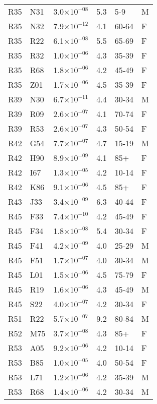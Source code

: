 \begin{longtable}{lllrll}
   R35 & N31 & 3.0$\times10^{-08}$ & 5.3 & 5-9 & M \\ 
   R35 & N32 & 7.9$\times10^{-12}$ & 4.1 & 60-64 & F \\ 
   R35 & R22 & 6.1$\times10^{-08}$ & 5.5 & 65-69 & F \\ 
   R35 & R32 & 1.0$\times10^{-06}$ & 4.3 & 35-39 & F \\ 
   R35 & R68 & 1.8$\times10^{-06}$ & 4.2 & 45-49 & F \\ 
   R35 & Z01 & 1.7$\times10^{-06}$ & 4.5 & 35-39 & F \\ 
   R39 & N30 & 6.7$\times10^{-11}$ & 4.4 & 30-34 & M \\ 
   R39 & R09 & 2.6$\times10^{-07}$ & 4.1 & 70-74 & F \\ 
   R39 & R53 & 2.6$\times10^{-07}$ & 4.3 & 50-54 & F \\ 
   R42 & G54 & 7.7$\times10^{-07}$ & 4.7 & 15-19 & M \\ 
   R42 & H90 & 8.9$\times10^{-09}$ & 4.1 & 85+ & F \\ 
   R42 & I67 & 1.3$\times10^{-05}$ & 4.2 & 10-14 & F \\ 
   R42 & K86 & 9.1$\times10^{-06}$ & 4.5 & 85+ & F \\ 
   R43 & J33 & 3.4$\times10^{-09}$ & 6.3 & 40-44 & F \\ 
   R45 & F33 & 7.4$\times10^{-10}$ & 4.2 & 45-49 & F \\ 
   R45 & F34 & 1.8$\times10^{-08}$ & 5.4 & 30-34 & F \\ 
   R45 & F41 & 4.2$\times10^{-09}$ & 4.0 & 25-29 & M \\ 
   R45 & F51 & 1.7$\times10^{-07}$ & 4.0 & 30-34 & M \\ 
   R45 & L01 & 1.5$\times10^{-06}$ & 4.5 & 75-79 & F \\ 
   R45 & R19 & 1.6$\times10^{-06}$ & 4.3 & 45-49 & M \\ 
   R45 & S22 & 4.0$\times10^{-07}$ & 4.2 & 30-34 & F \\ 
   R51 & R22 & 5.7$\times10^{-07}$ & 9.2 & 80-84 & M \\ 
   R52 & M75 & 3.7$\times10^{-08}$ & 4.3 & 85+ & F \\ 
   R53 & A05 & 9.2$\times10^{-06}$ & 4.2 & 10-14 & F \\ 
   R53 & B85 & 1.0$\times10^{-05}$ & 4.0 & 50-54 & F \\ 
   R53 & L71 & 1.2$\times10^{-06}$ & 4.2 & 35-39 & M \\ 
   R53 & R68 & 1.4$\times10^{-06}$ & 4.2 & 30-34 & M \\ 

\end{longtable}
